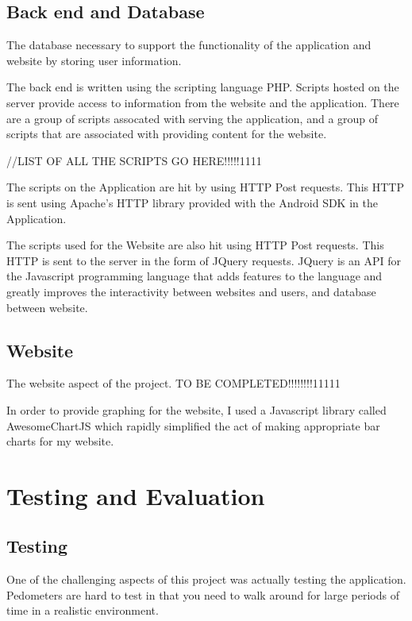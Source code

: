 \documentclass{l4proj}
\begin{document}
\section{Back end and Database}

The database necessary to support the functionality of the application and website by storing user information.

The back end is written using the scripting language PHP. Scripts hosted on the server provide access to information from the website and the application. There are a group of scripts assocated with serving the application, and a group of scripts that are associated with providing content for the website. 

//LIST OF ALL THE SCRIPTS GO HERE!!!!!1111

The scripts on the Application are hit by using HTTP Post requests. This HTTP is sent using Apache's HTTP library provided with the Android SDK in the Application. 

The scripts used for the Website are also hit using HTTP Post requests. This HTTP is sent to the server in the form of JQuery requests. JQuery is an API for the Javascript programming language that adds features to the language and greatly improves the interactivity between websites and users, and database between website.

\section{Website}

The website aspect of the project. TO BE COMPLETED!!!!!!!!11111

In order to provide graphing for the website, I used a Javascript library called AwesomeChartJS which rapidly simplified the act of making appropriate bar charts for my website.


\chapter{Testing and Evaluation}

\section{Testing}

One of the challenging aspects of this project was actually testing the application. Pedometers are hard to test in that you need to walk around for large periods of time in a realistic environment.
\end{document}
